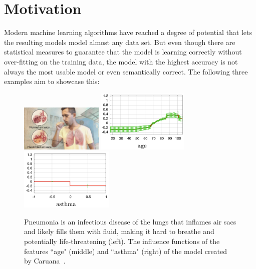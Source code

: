 \section{Motivation}
Modern machine learning algorithms have reached a degree of potential that lets the resulting models model almost any data set.
But even though there are statistical measures to guarantee that the model is learning correctly without over-fitting on the training data, the model with the highest accuracy is not always the most usable model or even semantically correct.
The following three examples aim to showcase this:

\begin{figure}
\centering
\includegraphics[height=6em,valign=t]{tex/introduction/pneumonia.png}
\includegraphics[height=8em,valign=t]{tex/introduction/age.png}
\includegraphics[height=8em,valign=t]{tex/introduction/asthma.png}
\caption[Influence functions of Pneumonia model.]{
Pneumonia is an infectious disease of the lungs that inflames air sacs and likely fills them with fluid, making it hard to breathe and potentially life-threatening (left\footnotemark).
The influence functions of the features ``age" (middle) and ``asthma" (right) of the model created by Caruana~\etal\cite{Caruana:2015:IMH:2783258.2788613}.
}
\label{figs:pneumonia}
\end{figure}

